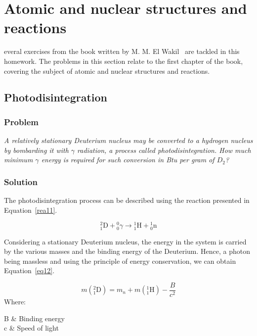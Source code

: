 %
%
\let\textcircled=\pgftextcircled
\chapter{Atomic and nuclear structures and reactions}

everal exercises from the book written by M. M. El Wakil~\cite{book01} are tackled in this homework. The problems in this section relate to the first chapter of the book, covering the subject of atomic and nuclear structures and reactions.

\section{Photodisintegration}
\label{prob11}

\subsection{Problem}
\textit{A relatively stationary Deuterium nucleus may be converted to a hydrogen nucleus by bombarding it with $\gamma$ radiation, a process called photodisintegration. How much minimum $\gamma$ energy is required for such conversion in Btu per gram of $D_2$?}

\subsection{Solution}

The photodisintegration process can be described using the reaction presented in Equation~\ref{rea11}.

\begin{equation}\label{rea11}
{}^2_1\textrm{D} + {}^{0}_{0}\gamma \to {}^{1}_{1}\textrm{H} + {}^1_0\textrm{n}
\end{equation}

Considering a stationary Deuterium nucleus, the energy in the system is carried by the various masses and the binding energy of the Deuterium. Hence, a photon being massless and using the principle of energy conservation, we can obtain Equation~\ref{eq12}.

\begin{equation}\label{eq12}
m({}^2_1\textrm{D}) = m_n + m({}^{1}_{1}\textrm{H}) - \frac{B}{c^2}
\end{equation}
Where:

\begin{conditions}
 B      &  Binding energy \\
 c      & Speed of light
\end{conditions}

